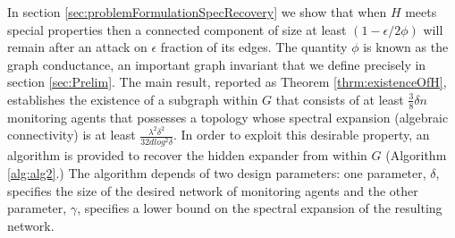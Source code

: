 \documentclass[reqno,8pt]{amsart}
\theoremstyle{definition}
\theoremstyle{remark}
\numberwithin{equation}{section}
\def\cV{\mathcal{V}}
\begin{document}

\medskip
In section \ref{sec:problemFormulationSpecRecovery} we show that when $H$ meets special properties then a connected component of size at least $(1-\epsilon/2\phi)$ will remain  after an attack on $\epsilon$ fraction of its edges. The quantity $\phi$ is known as the graph conductance, an important graph invariant that we define precisely in section \ref{sec:Prelim}. The main result, reported as Theorem \ref{thrm:existenceOfH}, establishes the existence of a subgraph within $G$ that consists of at least $\frac{3}{8} \delta n$ monitoring agents that possesses a topology whose spectral expansion (algebraic connectivity) is at least $\frac{\lambda^2\delta^2}{32d log^2 \delta}$. In order to exploit this desirable property, an algorithm is provided to recover the hidden expander from within $G$ (Algorithm \ref{alg:alg2}.) The algorithm depends of two design parameters: one parameter, $\delta$, specifies the size of the desired network of monitoring agents and the other parameter, $\gamma$, specifies a lower bound on the spectral expansion of the resulting network. 



\end{document}
